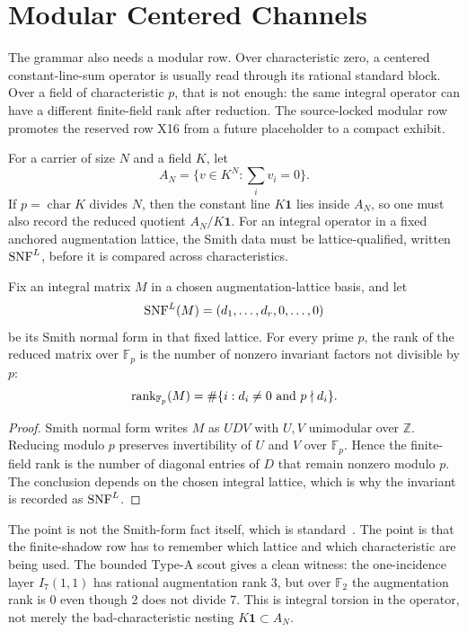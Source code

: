 \section{Modular Centered Channels}
\label{sec:modular-centered-channels}

The grammar also needs a modular row.  Over characteristic zero, a centered constant-line-sum operator is usually read through its rational standard block.  Over a field of characteristic \(p\), that is not enough: the same integral operator can have a different finite-field rank after reduction.  The source-locked modular row promotes the reserved row X16 from a future placeholder to a compact exhibit.

For a carrier of size \(N\) and a field \(K\), let
\[
  A_N=\{v\in K^N:\sum_i v_i=0\}.
\]
If \(p=\operatorname{char}K\) divides \(N\), then the constant line \(K\mathbf1\) lies inside \(A_N\), so one must also record the reduced quotient \(A_N/K\mathbf1\).  For an integral operator in a fixed anchored augmentation lattice, the Smith data must be lattice-qualified, written \(\operatorname{SNF}^{L}\), before it is compared across characteristics.

\begin{proposition}\label{prop:modular-snf-bridge}
Fix an integral matrix \(M\) in a chosen augmentation-lattice basis, and let
\[
  \operatorname{SNF}^{L}(M)=(d_1,\ldots,d_r,0,\ldots,0)
\]
be its Smith normal form in that fixed lattice.  For every prime \(p\), the rank of the reduced matrix over \(\mathbb F_p\) is the number of nonzero invariant factors not divisible by \(p\):
\[
  \operatorname{rank}_{\mathbb F_p}(M)=\#\{i:d_i\neq0\text{ and }p\nmid d_i\}.
\]
\end{proposition}

\begin{proof}
Smith normal form writes \(M\) as \(UDV\) with \(U,V\) unimodular over \(\mathbb Z\).  Reducing modulo \(p\) preserves invertibility of \(U\) and \(V\) over \(\mathbb F_p\).  Hence the finite-field rank is the number of diagonal entries of \(D\) that remain nonzero modulo \(p\).  The conclusion depends on the chosen integral lattice, which is why the invariant is recorded as \(\operatorname{SNF}^{L}\).
\end{proof}

The point is not the Smith-form fact itself, which is standard~\cite{StanleySmithNormalForm2016,Sin2013}.  The point is that the finite-shadow row has to remember which lattice and which characteristic are being used.  The bounded Type-A scout gives a clean witness: the one-incidence layer \(I_7(1,1)\) has rational augmentation rank 3, but over \(\mathbb F_2\) the augmentation rank is 0 even though 2 does not divide 7.  This is integral torsion in the operator, not merely the bad-characteristic nesting \(K\mathbf1\subset A_N\).

